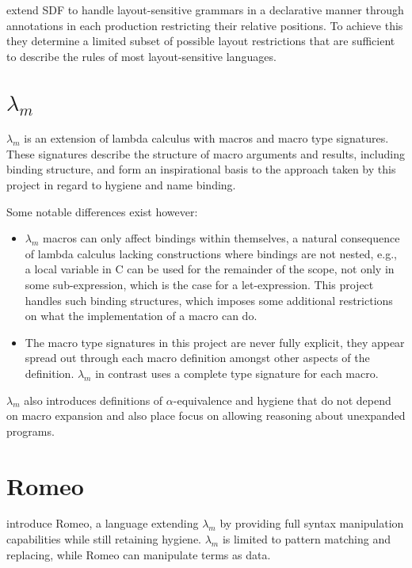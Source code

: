 \documentclass{kththesis}
\begin{document}
\textcite{Erdweg2013} extend SDF to handle layout-sensitive grammars in a declarative manner through annotations in each production restricting their relative positions. To achieve this they determine a limited subset of possible layout restrictions that are sufficient to describe the rules of most layout-sensitive languages.

\section{$\lambda_m$}

$\lambda_m$ \cite{Herman2010} is an extension of lambda calculus with macros and macro type signatures. These signatures describe the structure of macro arguments and results, including binding structure, and form an inspirational basis to the approach taken by this project in regard to hygiene and name binding.

Some notable differences exist however:
\begin{itemize}
  \item $\lambda_m$ macros can only affect bindings within themselves, a natural consequence of lambda calculus lacking constructions where bindings are not nested, e.g., a local variable in C can be used for the remainder of the scope, not only in some sub-expression, which is the case for a let-expression. This project handles such binding structures, which imposes some additional restrictions on what the implementation of a macro can do.
  \item The macro type signatures in this project are never fully explicit, they appear spread out through each macro definition amongst other aspects of the definition. $\lambda_m$ in contrast uses a complete type signature for each macro.
\end{itemize}

$\lambda_m$ also introduces definitions of $\alpha$-equivalence and hygiene that do not depend on macro expansion and also place focus on allowing reasoning about unexpanded programs.

\section{Romeo}

\textcite{Stansifer2014} introduce Romeo, a language extending $\lambda_m$ by providing full syntax manipulation capabilities while still retaining hygiene. $\lambda_m$ is limited to pattern matching and replacing, while Romeo can manipulate terms as data.
\end{document}
